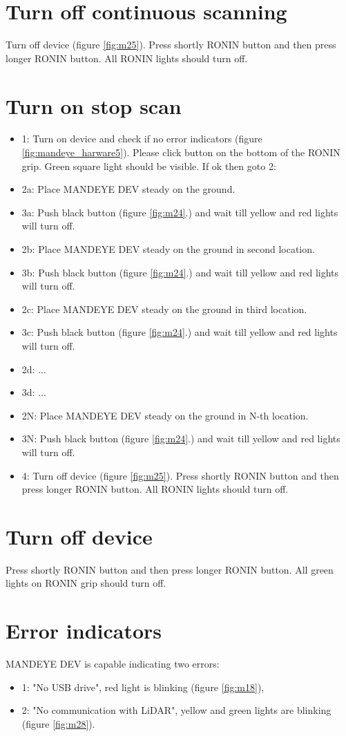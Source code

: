 \section{Turn off continuous scanning}
Turn off device (figure \ref{fig:m25}). 
Press shortly RONIN button and then press longer RONIN button. All RONIN lights should turn off.

\section{Turn on stop scan}
\begin{itemize}
	\item 1: Turn on device and check if no error indicators (figure \ref{fig:mandeye_harware5}). 
	Please click button on the bottom of the RONIN grip. 
	Green square light should be visible.
	If ok then goto 2:
	\item 2a: Place MANDEYE DEV steady on the ground.
	\item 3a: Push black button (figure \ref{fig:m24}.) and wait till yellow and red lights will turn off.
	\item 2b: Place MANDEYE DEV steady on the ground in second location.
	\item 3b: Push black button (figure \ref{fig:m24}.) and wait till yellow and red lights will turn off.
	\item 2c: Place MANDEYE DEV steady on the ground in third location.
	\item 3c: Push black button (figure \ref{fig:m24}.) and wait till yellow and red lights will turn off.
	\item 2d: ...
	\item 3d: ...
	\item 2N: Place MANDEYE DEV steady on the ground in N-th location.
	\item 3N: Push black button (figure \ref{fig:m24}.) and wait till yellow and red lights will turn off.
	\item 4: Turn off device (figure \ref{fig:m25}). 
	Press shortly RONIN button and then press longer RONIN button. All RONIN lights should turn off.
\end{itemize}

\section{Turn off device}
Press shortly RONIN button and then press longer RONIN button. All green lights on RONIN grip should turn off.

\section{Error indicators}
\label{section:errors}
MANDEYE DEV is capable indicating two errors:
\begin{itemize}
	\item 1: "No USB drive", red light is blinking (figure \ref{fig:m18}),
	\item 2: "No communication with LiDAR", yellow and green lights are blinking (figure \ref{fig:m28}).
\end{itemize}
	
